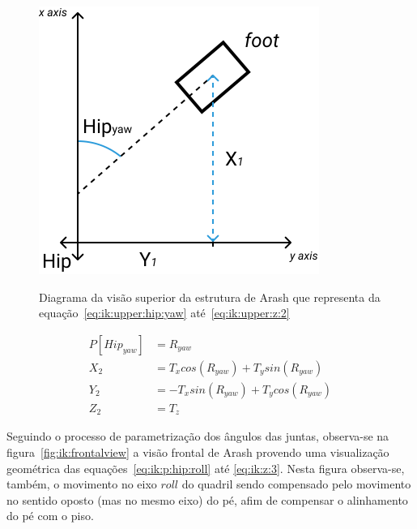 \begin{figure}[htb]
	\centering
	\includegraphics[scale=1.5]{imagens/svg/inverse-kinematics-upperview}
	\caption{Diagrama da visão superior da estrutura de Arash que representa da equação~\ref{eq:ik:upper:hip:yaw} até~\ref{eq:ik:upper:z:2}}
	\caption*{\cite{karimionline}}
	\label{fig:ik:upperview}
\end{figure}

\begin{align}
	P[Hip_{yaw}] &= R_{yaw}                             \label{eq:ik:upper:hip:yaw}  \\
	         X_2 &= T_x cos(R_{yaw}) + T_y sin(R_{yaw})  \label{eq:ik:upper:x:2}      \\
	         Y_2 &= -T_x sin(R_{yaw}) + T_ycos(R_{yaw})   \label{eq:ik:upper:y:2}      \\
	         Z_2 &= T_z                                    \label{eq:ik:upper:z:2}
\end{align}

Seguindo o processo de parametrização dos ângulos das juntas, observa-se na figura~\ref{fig:ik:frontalview} a visão frontal de Arash provendo uma visualização geométrica das equações~\ref{eq:ik:p:hip:roll} até \ref{eq:ik:z:3}. Nesta figura observa-se, também, o movimento no eixo $roll$ do quadril sendo compensado pelo movimento no sentido oposto (mas no mesmo eixo) do pé, afim de compensar o alinhamento do pé com o piso.


